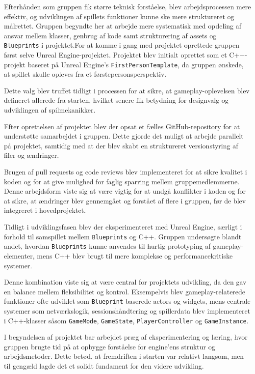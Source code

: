 Efterhånden som gruppen fik større teknisk forståelse, blev arbejdsprocessen mere effektiv, og udviklingen af spillets funktioner kunne ske mere struktureret og målrettet. Gruppen begyndte her at arbejde mere systematisk med opdeling af ansvar mellem klasser, genbrug af kode samt strukturering af assets og \texttt{Blueprints} i projektet.For at komme i gang med projektet oprettede gruppen først selve Unreal Engine-projektet. Projektet blev initialt oprettet som et C++-projekt baseret på Unreal Engine’s \texttt{FirstPersonTemplate}, da gruppen ønskede, at spillet skulle opleves fra et førstepersonsperspektiv.

Dette valg blev truffet tidligt i processen for at sikre, at gameplay-oplevelsen blev defineret allerede fra starten, hvilket senere fik betydning for designvalg og udviklingen af spilmekanikker.

Efter oprettelsen af projektet blev der opsat et fælles GitHub-repository for at understøtte samarbejdet i gruppen. Dette gjorde det muligt at arbejde parallelt på projektet, samtidig med at der blev skabt en struktureret versionstyring af filer og ændringer.

Brugen af pull requests og code reviews blev implementeret for at sikre kvalitet i koden og for at give mulighed for faglig sparring mellem gruppemedlemmerne. Denne arbejdsform viste sig at være vigtig for at undgå konflikter i koden og for at sikre, at ændringer blev gennemgået og forstået af flere i gruppen, før de blev integreret i hovedprojektet.

Tidligt i udviklingsfasen blev der eksperimenteret med Unreal Engine, særligt i forhold til samspillet mellem \texttt{Blueprints} og C++. Gruppen undersøgte blandt andet, hvordan \texttt{Blueprints} kunne anvendes til hurtig prototyping af gameplay-elementer, mens C++ blev brugt til mere komplekse og performancekritiske systemer.

Denne kombination viste sig at være central for projektets udvikling, da den gav en balance mellem fleksibilitet og kontrol. Eksempelvis blev gameplay-relaterede funktioner ofte udviklet som \texttt{Blueprint}-baserede actors og widgets, mens centrale systemer som netværkslogik, sessionshåndtering og spillerdata blev implementeret i C++-klasser såsom \texttt{GameMode}, \texttt{GameState}, \texttt{PlayerController} og \texttt{GameInstance}.

I begyndelsen af projektet bar arbejdet præg af eksperimentering og læring, hvor gruppen brugte tid på at opbygge forståelse for engine’ens struktur og arbejdsmetoder. Dette betød, at fremdriften i starten var relativt langsom, men til gengæld lagde det et solidt fundament for den videre udvikling.

